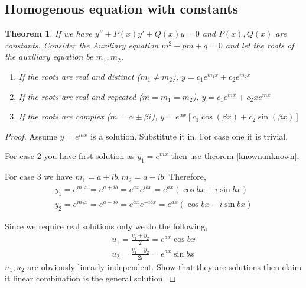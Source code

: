\documentclass[oneside,11pt,pdftex,final]{book}%
\numberwithin{equation}{section}
\newtheorem{theorem}{Theorem}[chapter]%
\newtheorem{example}[theorem]{Example}
\numberwithin{section}{chapter}
\numberwithin{equation}{chapter}
\begin{document}
\subsection{Homogenous equation with constants}
\begin{theorem}
	If we have $ y''+P(x) y'+Q(x)y=0$ and $ P(x) ,Q(x)$ are constants. Consider the Auxiliary equation $ m^2+pm+q=0 $ and let the roots of the auxiliary equation be $ m_1, m_2 $.
	\begin{enumerate}
		\item If the roots are real and distinct ($ m_1\neq m_2 $), $ y=c_1e^{m_1x}+c_2e^{m_2x} $
		\item If the roots are real and repeated ($ m=m_1=m_2 $), $ y=c_1e^{mx}+c_2xe^{mx} $
		\item If the roots are complex ($ m=\alpha\pm \beta i $), $ y=e^{\alpha x}[c_1 \cos (\beta x)+c_2 \sin (\beta x)] $
	\end{enumerate}
\end{theorem}
\begin{proof}
	Assume $ y=e^{mx} $ is a solution. Substitute it in. For case one it is trivial.
	
	For case 2 you have first solution as $ y_1=e^{mx} $ then use theorem \ref{knownunknown}.
	
	For case 3 we have $ m_1=a+ib, m_2=a-ib $. Therefore,
	\begin{align*}
		y_1=e^{m_1x}=e^{a+ib}=e^{ax}e^{ibx}=e^{ax}(\cos bx+i \sin bx)\\
		y_2=e^{m_2x}=e^{a-ib}=e^{ax}e^{-ibx}=e^{ax}(\cos bx - i \sin bx)
	\end{align*}

	Since we require real solutions only we do the following,
	\begin{align*}
		u_1=\frac{y_1+y_2}{2}=e^{ax}\cos bx\\
		u_2=\frac{y_1-y_2}{2i}=e^{ax} \sin bx
	\end{align*}
	$ u_1,u_2 $ are obviously linearly independent. Show that they are solutions then claim it linear combination is the general solution.
\end{proof}
%
\end{document}
